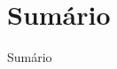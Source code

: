 \documentclass[9pt]{beamer}
\begin{document}
\begin{frame}
  \titlepage
\end{frame}

\section*{Sumário}

\begin{frame}{Sumário}
  \tableofcontents %
\end{frame}

%
%
%

%
%
%
%
%
%
%
%
%
%
%


\end{document}
